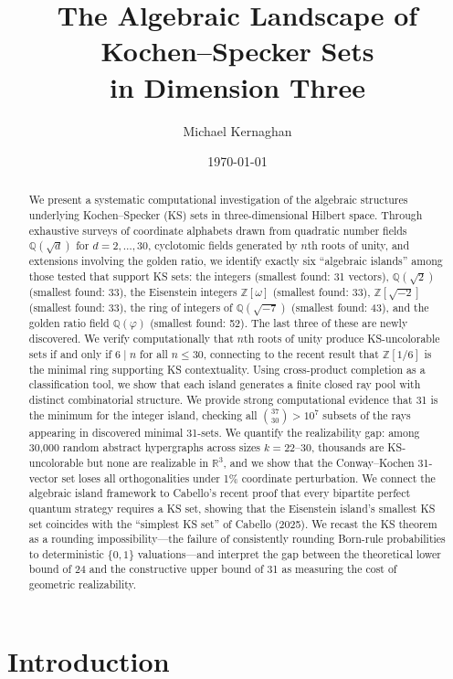 \documentclass[12pt,a4paper]{article}
\title{The Algebraic Landscape of Kochen--Specker Sets\\in Dimension Three}
\author{Michael Kernaghan}
\date{\today}
\newcommand{\R}{\mathbb{R}}
\newcommand{\Z}{\mathbb{Z}}
\newcommand{\Q}{\mathbb{Q}}
\begin{document}
\maketitle

\begin{abstract}
We present a systematic computational investigation of the algebraic structures underlying Kochen--Specker (KS) sets in three-dimensional Hilbert space. Through exhaustive surveys of coordinate alphabets drawn from quadratic number fields $\Q(\sqrt{d})$ for $d = 2, \ldots, 30$, cyclotomic fields generated by $n$th roots of unity, and extensions involving the golden ratio, we identify exactly six ``algebraic islands'' among those tested that support KS sets: the integers (smallest found: 31 vectors), $\Q(\sqrt{2})$ (smallest found: 33), the Eisenstein integers $\Z[\omega]$ (smallest found: 33), $\Z[\sqrt{-2}]$ (smallest found: 33), the ring of integers of $\Q(\sqrt{-7})$ (smallest found: 43), and the golden ratio field $\Q(\varphi)$ (smallest found: 52). The last three of these are newly discovered. We verify computationally that $n$th roots of unity produce KS-uncolorable sets if and only if $6 \mid n$ for all $n \leq 30$, connecting to the recent result that $\Z[1/6]$ is the minimal ring supporting KS contextuality. Using cross-product completion as a classification tool, we show that each island generates a finite closed ray pool with distinct combinatorial structure. We provide strong computational evidence that 31 is the minimum for the integer island, checking all $\binom{37}{30} > 10^7$ subsets of the rays appearing in discovered minimal 31-sets. We quantify the realizability gap: among 30{,}000 random abstract hypergraphs across sizes $k = 22$--$30$, thousands are KS-uncolorable but none are realizable in $\R^3$, and we show that the Conway--Kochen 31-vector set loses all orthogonalities under 1\% coordinate perturbation. We connect the algebraic island framework to Cabello's recent proof that every bipartite perfect quantum strategy requires a KS set, showing that the Eisenstein island's smallest KS set coincides with the ``simplest KS set'' of Cabello (2025). We recast the KS theorem as a rounding impossibility---the failure of consistently rounding Born-rule probabilities to deterministic $\{0,1\}$ valuations---and interpret the gap between the theoretical lower bound of 24 and the constructive upper bound of 31 as measuring the cost of geometric realizability.
\end{abstract}

\section{Introduction}
\end{document}

